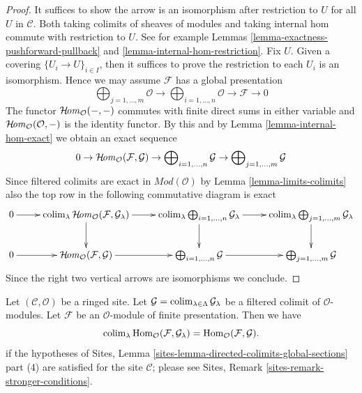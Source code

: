 \begin{proof}
It suffices to show the arrow is an isomorphism after restriction to $U$
for all $U$ in $\mathcal{C}$. Both taking colimits of sheaves of
modules and taking internal hom commute with restriction to $U$.
See for example Lemmas \ref{lemma-exactness-pushforward-pullback} and
\ref{lemma-internal-hom-restriction}. Fix $U$. Given a covering
$\{U_i \to U\}_{i \in I}$, then it suffices to prove the restriction
to each $U_i$ is an isomorphism. Hence we may assume
$\mathcal{F}$ has a global presentation
$$
\bigoplus\nolimits_{j = 1, \ldots, m}
\mathcal{O}
\longrightarrow
\bigoplus\nolimits_{i = 1, \ldots, n}
\mathcal{O}
\to
\mathcal{F}
\to
0
$$
The functor $\mathop{\mathcal{H}\!\mathit{om}}\nolimits_\mathcal{O}(-, -)$ commutes with finite direct sums
in either variable and $\mathop{\mathcal{H}\!\mathit{om}}\nolimits_\mathcal{O}(\mathcal{O}, -)$
is the identity functor. By this and by Lemma \ref{lemma-internal-hom-exact}
we obtain an exact sequence
$$
0 \to
\mathop{\mathcal{H}\!\mathit{om}}\nolimits_\mathcal{O}(\mathcal{F}, \mathcal{G}) \to
\bigoplus\nolimits_{i = 1, \ldots, n} \mathcal{G} \to
\bigoplus\nolimits_{j = 1, \ldots, m} \mathcal{G}
$$
Since filtered colimits are exact in $\textit{Mod}(\mathcal{O})$
by Lemma \ref{lemma-limits-colimits}
also the top row in the following commutative diagram is exact
$$
\xymatrix{
0 \ar[r] &
\colim_\lambda \SheafHom_\mathcal{O}(\mathcal{F}, \mathcal{G}_\lambda)
\ar[r] \ar[d] &
\colim_\lambda \bigoplus\nolimits_{i = 1, \ldots, n} \mathcal{G}_\lambda
\ar[r] \ar[d] &
\colim_\lambda \bigoplus\nolimits_{j = 1, \ldots, m} \mathcal{G}_\lambda
\ar[d] \\
0 \ar[r] &
\SheafHom_\mathcal{O}(\mathcal{F}, \mathcal{G}) \ar[r] &
\bigoplus\nolimits_{i = 1, \ldots, n} \mathcal{G} \ar[r] &
\bigoplus\nolimits_{j = 1, \ldots, m} \mathcal{G}
}
$$
Since the right two vertical arrows are isomorphisms we conclude.
\end{proof}

\begin{lemma}
\label{lemma-finite-presentation-quasi-compact-colimit}
Let $(\mathcal{C}, \mathcal{O})$ be a ringed site.
Let $\mathcal{G} = \mathop{\mathrm{colim}}\nolimits_{\lambda \in \Lambda} \mathcal{G}_\lambda$
be a filtered colimit of $\mathcal{O}$-modules.
Let $\mathcal{F}$ be an $\mathcal{O}$-module of finite presentation.
Then we have
$$
\mathop{\mathrm{colim}}\nolimits_\lambda \mathop{\mathrm{Hom}}\nolimits_\mathcal{O}(\mathcal{F}, \mathcal{G}_\lambda)
=
\mathop{\mathrm{Hom}}\nolimits_\mathcal{O}(\mathcal{F}, \mathcal{G}).
$$
if the hypotheses of
Sites, Lemma \ref{sites-lemma-directed-colimits-global-sections} part (4)
are satisfied for the site $\mathcal{C}$; please see
Sites, Remark \ref{sites-remark-stronger-conditions}.
\end{lemma}

